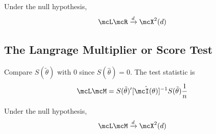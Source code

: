 Under the null hypothesis,
\begin{equation}
    \mcL\mcR \xrightarrow{d} \mcX^2(d)
\end{equation}

\subsection{The Langrage Multiplier or Score Test}
Compare $S(\tilde{\theta})$ with $0$ since $S(\hat{\theta}) = 0$.
The test statistic is 
\begin{equation}
    \mcL\mcM = S(\tilde{\theta})'[\hat{\mcI(\theta)}]^{-1}S(\tilde{\theta})\frac{1}{n}
\end{equation}

Under the null hypothesis, 
\begin{equation}
    \mcL\mcM\xrightarrow{d}\mcX^2(d)
\end{equation}


